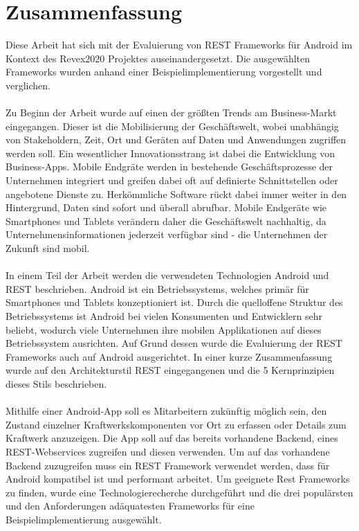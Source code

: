 \chapter{Zusammenfassung}
\label{sec:summary}
Diese Arbeit hat sich mit der Evaluierung von REST Frameworks für Android im Kontext des Revex2020 Projektes auseinandergesetzt. Die ausgewählten Frameworks wurden anhand einer Beispielimplementierung vorgestellt und verglichen.
\\\\
Zu Beginn der Arbeit wurde auf einen der größten Trends am Business-Markt eingegangen. Dieser ist die Mobilisierung der Geschäftswelt, wobei unabhängig von Stakeholdern, Zeit, Ort und Geräten auf Daten und Anwendungen zugriffen werden soll. Ein wesentlicher Innovationsstrang ist dabei die Entwicklung von Business-Apps. Mobile Endgräte werden in bestehende Geschäftsprozesse der Unternehmen integriert und greifen dabei oft auf definierte Schnittstellen oder angebotene Dienste zu. Herkömmliche Software rückt dabei immer weiter in den Hintergrund, Daten sind sofort und überall abrufbar. Mobile Endgeräte wie Smartphones und Tablets verändern daher die Geschäftswelt nachhaltig, da Unternehmensinformationen jederzeit verfügbar sind - die Unternehmen der Zukunft sind mobil.
\\\\
In einem Teil der Arbeit werden die verwendeten Technologien Android und REST beschrieben. Android ist ein Betriebssystems, welches primär für Smartphones und Tablets konzeptioniert ist. Durch die quelloffene Struktur des Betriebssystems ist Android bei vielen Konsumenten und Entwicklern sehr beliebt, wodurch viele Unternehmen ihre mobilen Applikationen auf dieses Betriebssystem ausrichten. Auf Grund dessen wurde die Evaluierung der REST Frameworks auch auf Android ausgerichtet. In einer kurze Zusammenfassung wurde auf den Architekturstil REST eingegangenen und die 5 Kernprinzipien dieses Stils beschrieben.
\\\\
Mithilfe einer Android-App soll es Mitarbeitern zukünftig möglich sein, den Zustand einzelner Kraftwerkskomponenten vor Ort zu erfassen oder Details zum Kraftwerk anzuzeigen. Die App soll auf das bereits vorhandene Backend, eines REST-Webservices zugreifen und diesen verwenden. Um auf das vorhandene Backend zuzugreifen muss ein REST Framework verwendet werden, dass für Android kompatibel ist und performant arbeitet. Um geeignete Rest Frameworks zu finden, wurde eine Technologierecherche durchgeführt und die drei populärsten und den Anforderungen adäquatesten Frameworks für eine Beispielimplementierung ausgewählt.
